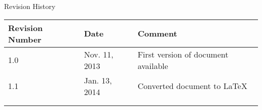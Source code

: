 \begin{center}
  {\large Revision History}
  \begin{tabular}{ | l | l | l | }
    \hline
    Revision Number & Date           & Comment \\
    \hline \hline
    1.0             & Nov. 11, 2013  & First version of document available \\ \hline
    1.1             & Jan. 13, 2014  & Converted document to \LaTeX \\ \hline
                    &                & \\ \hline
                    &                & \\ \hline
  \end{tabular}
\end{center}

\newpage

